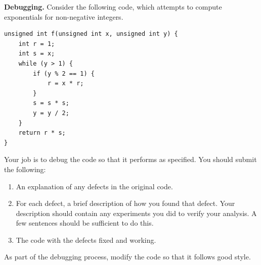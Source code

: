 \documentclass{exam}
\begin{document}
\begin{questions}
\question[12]
\textbf{Debugging.}
Consider the following code, which attempts to compute exponentials for non-negative integers. 
\begin{verbatim}
unsigned int f(unsigned int x, unsigned int y) {
    int r = 1;
    int s = x;
    while (y > 1) {
        if (y % 2 == 1) {
            r = x * r;
        }
        s = s * s;
        y = y / 2;
    }
    return r * s;
}
\end{verbatim}
Your job is to debug the code so that it performs as specified. 
You should submit the following:
\begin{enumerate}
\item An explanation of any defects in the original code. 
\item For each defect, a brief description of how you found that defect. 
Your description should contain any experiments you did to verify your analysis. 
A few sentences should be sufficient to do this. 
\item The code with the defects fixed and working. 
\end{enumerate}
As part of the debugging process, modify the code so that it follows good style. 

\end{questions}
\end{document}
